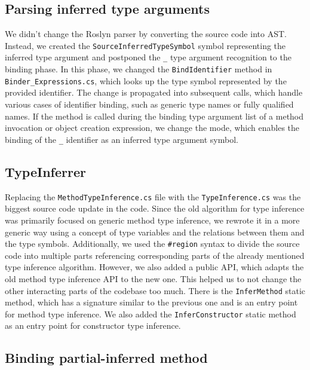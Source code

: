 \subsection{Parsing inferred type arguments}

We didn’t change the Roslyn parser by converting the source code into \ac{AST}. 
Instead, we created the \texttt{SourceInferredTypeSymbol} symbol representing the inferred type argument and postponed the \texttt{\_} type argument recognition to the binding phase. 
In this phase, we changed the \texttt{BindIdentifier} method in\\ \texttt{Binder\_Expressions.cs}, which looks up the type symbol represented by the provided identifier. 
The change is propagated into subsequent calls, which handle various cases of identifier binding, such as generic type names or fully qualified names. 
If the method is called during the binding type argument list of a method invocation or object creation expression, we change the mode, which enables the binding of the \texttt{\_} identifier as an inferred type argument symbol.

\subsection{TypeInferrer}

Replacing the \texttt{MethodTypeInference.cs} file with the \texttt{TypeInference.cs} was the biggest source code update in the code. 
Since the old algorithm for type inference was primarily focused on generic method type inference, we rewrote it in a more generic way using a concept of type variables and the relations between them and the type symbols. 
Additionally, we used the \texttt{\#region} syntax to divide the source code into multiple parts referencing corresponding parts of the already mentioned type inference algorithm. 
However, we also added a public API, which adapts the old method type inference API to the new one. 
This helped us to not change the other interacting parts of the codebase too much. 
There is the \texttt{InferMethod} static method, which has a signature similar to the previous one and is an entry point for method type inference. 
We also added the \texttt{InferConstructor} static method as an entry point for constructor type inference.

\subsection{Binding partial-inferred method}

